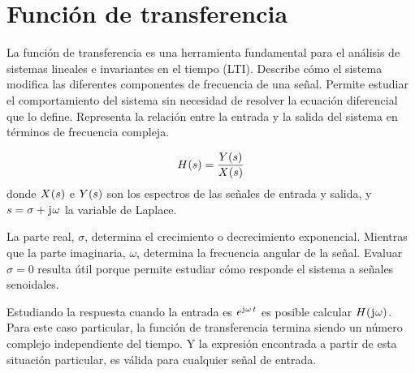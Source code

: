 \begin{mdframed}[style=DefinitionFrame]
    \begin{defn}
    \end{defn}
\end{mdframed}

\begin{mdframed}[style=DefinitionFrame]
    \begin{defn}
    \end{defn}
\end{mdframed}

\section{Función de transferencia}

La función de transferencia es una herramienta fundamental para el análisis de sistemas lineales e invariantes en el tiempo (LTI).
Describe cómo el sistema modifica las diferentes componentes de frecuencia de una señal.
Permite estudiar el comportamiento del sistema sin necesidad de resolver la ecuación diferencial que lo define.
Representa la relación entre la entrada y la salida del sistema en términos de frecuencia compleja.

\begin{mdframed}[style=DefinitionFrame]
    \begin{defn}
    \end{defn}
    \[
        \fx[H]{s} = \frac{\fx[Y]{s}}{\fx[X]{s}}
    \]
    donde $\fx[X]{s}$ e $\fx[Y]{s}$ son los espectros de las señales de entrada y salida, y $s = \sigma + \iu \omega$ la variable de Laplace.
\end{mdframed}

La parte real, $\sigma$, determina el crecimiento o decrecimiento exponencial.
Mientras que la parte imaginaria, $\omega$, determina la frecuencia angular de la señal.
Evaluar $\sigma = 0$ resulta útil porque permite estudiar cómo responde el sistema a señales senoidales.

Estudiando la respuesta cuando la entrada es $e^{\iu \omega \, t}$ es posible calcular $\fx[H]{\iu \omega}$.
Para este caso particular, la función de transferencia termina siendo un número complejo independiente del tiempo.
Y la expresión encontrada a partir de esta situación particular, es válida para cualquier señal de entrada.

